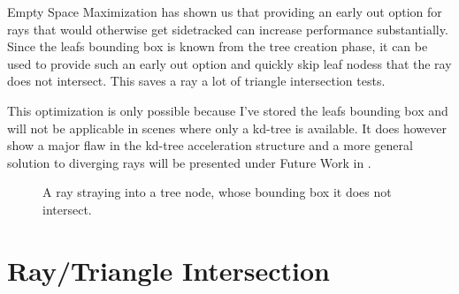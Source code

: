 Empty Space Maximization has shown us that providing an early out option for
rays that would otherwise get sidetracked can increase performance
substantially. 
Since the leafs bounding box is known from the tree creation phase, it can be
used to provide such an early out option and quickly skip leaf nodess that the
ray does not intersect. This saves a ray a lot of triangle intersection tests.

This optimization is only possible because I've stored the leafs bounding box
and will not be applicable in scenes where only a kd-tree is available. It does
however show a major flaw in the kd-tree acceleration structure and a more
general solution to diverging rays will be presented under Future Work in
.

\begin{figure}
  \centering
  \caption{A ray straying into a tree node, whose bounding box it does
    not intersect.}
  \label{fig:waywardRay}
\end{figure}





\section{Ray/Triangle Intersection}\label{sec:intersection}

